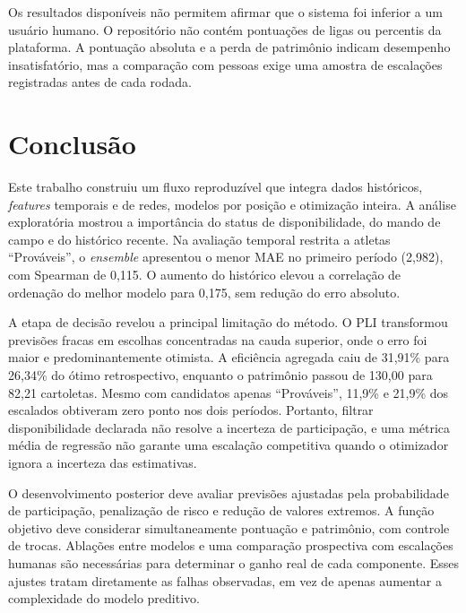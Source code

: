 \documentclass[12pt, a4paper, oneside]{article}
\begin{document}
Os resultados disponíveis não permitem afirmar que o sistema foi inferior a um
usuário humano. O repositório não contém pontuações de ligas ou percentis da
plataforma. A pontuação absoluta e a perda de patrimônio indicam desempenho
insatisfatório, mas a comparação com pessoas exige uma amostra de escalações
registradas antes de cada rodada.

\section{Conclusão}
\label{sec:conclusao}

Este trabalho construiu um fluxo reproduzível que integra dados históricos,
\textit{features} temporais e de redes, modelos por posição e otimização inteira.
A análise exploratória mostrou a importância do status de disponibilidade, do
mando de campo e do histórico recente. Na avaliação temporal restrita a atletas
``Prováveis'', o \textit{ensemble} apresentou o menor MAE no primeiro período
(2,982), com Spearman de 0,115. O aumento do histórico elevou a correlação de
ordenação do melhor modelo para 0,175, sem redução do erro absoluto.

A etapa de decisão revelou a principal limitação do método. O PLI transformou
previsões fracas em escolhas concentradas na cauda superior, onde o erro foi
maior e predominantemente otimista. A eficiência agregada caiu de 31,91\% para
26,34\% do ótimo retrospectivo, enquanto o patrimônio passou de 130,00 para
82,21 cartoletas. Mesmo com candidatos apenas ``Prováveis'', 11,9\% e 21,9\% dos
escalados obtiveram zero ponto nos dois períodos. Portanto, filtrar disponibilidade
declarada não resolve a incerteza de participação, e uma métrica média de
regressão não garante uma escalação competitiva quando o otimizador ignora a
incerteza das estimativas.

O desenvolvimento posterior deve avaliar previsões ajustadas pela probabilidade
de participação, penalização de risco e redução de valores extremos. A função
objetivo deve considerar simultaneamente pontuação e patrimônio, com controle de
trocas. Ablações entre modelos e uma comparação prospectiva com escalações humanas
são necessárias para determinar o ganho real de cada componente. Esses ajustes
tratam diretamente as falhas observadas, em vez de apenas aumentar a complexidade
do modelo preditivo.

\newpage


\end{document}
